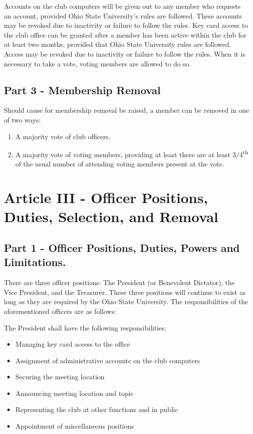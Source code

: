 \documentclass{article}
\begin{document}
	Accounts on the club computers will be given out to any member who requests an account, provided Ohio State University's rules are followed.  These accounts may be revoked due to inactivity or failure to follow the rules.  Key card access to the club office can be granted after a member has been active within the club for at least two months, provided that Ohio State University rules are followed.  Access may be revoked due to inactivity or failure to follow the rules.
	When it is necessary to take a vote, voting members are allowed to do so.

	\subsection{Part 3 - Membership Removal}

	Should cause for membership removal be raised, a member can be removed in one of two ways:
	\begin{enumerate}
		\item A majority vote of club officers.
		\item A majority vote of voting members, providing at least there are at least 3/4\textsuperscript{th} of the usual number of attending voting members present at the vote.
	\end{enumerate}

	\section{Article III - Officer Positions, Duties, Selection, and Removal}

	\subsection{Part 1 - Officer Positions, Duties, Powers and Limitations.}

	There are three officer positions: The President (or Benevolent Dictator), the Vice President, and the Treasurer.  These three positions will continue to exist as long as they are required by the Ohio State University.  The responsibilities of the aforementioned officers are as follows:

	The President shall have the following responsibilities:

	\begin{itemize}
		\item Managing key card access to the office
		\item Assignment of administrative accounts on the club computers
		\item Securing the meeting location
		\item Announcing meeting location and topic
		\item Representing the club at other functions and in public
		\item Appointment of miscellaneous positions
	\end{itemize}
\end{document}

